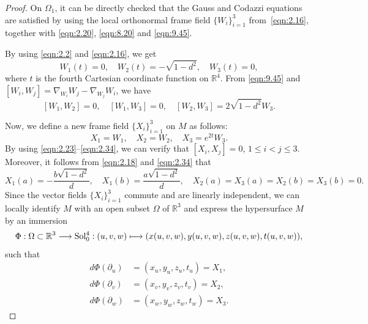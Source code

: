 \documentclass[reqno]{amsart}%
\theoremstyle{definition}
\numberwithin{equation}{section}
\begin{document}
	\begin{proof}
		On $\Omega_{1}$, it can be directly checked that the Gauss and Codazzi equations are satisfied by using the
		local orthonormal frame field $\{W_i\}_{i=1}^3$ from~\eqref{eqn:2.16}, together with \eqref{eqn:2.20}, \eqref{eqn:8.20}
		and \eqref{eqn:9.45}. 
		
		By using \eqref{eqn:2.2} and \eqref{eqn:2.16}, we get
		\begin{equation}\label{eqn:2.23}
			W_1(t)=0, \quad W_2(t)=-\sqrt{1-d^2}, \quad W_3(t)=0,
		\end{equation}
		where $t$ is the fourth Cartesian coordinate function on $\mathbb{R}^4$.
		From \eqref{eqn:9.45} and $[W_i,W_j]=\nabla_{W_i}W_j-\nabla_{W_j}W_i$, we have
		\begin{equation}\label{eqn:2.223}
			[W_1,W_2]=0, \quad [W_1,W_3]=0, \quad [W_2,W_3]=2\sqrt{1-d^2}W_3.
		\end{equation}
		
		Now, we define a new frame field $\{X_i\}_{i=1}^3$ on $M$ as follows:
		\begin{equation}\label{eqn:2.34}
			X_1=W_1, \quad X_2=W_2, \quad X_3=e^{2t}W_3.
		\end{equation}
		By using \eqref{eqn:2.23}--\eqref{eqn:2.34},
		we can verify that $[X_i,X_j]=0$, $1\leq i<j\leq3$.
		Moreover, it follows from \eqref{eqn:2.18} and \eqref{eqn:2.34} that
		\begin{equation}
			\label{eqn:2.31}    
			X_1(a)=-\frac{b\sqrt{1-d^2}}{d}, \quad
			X_1(b)=\frac{a\sqrt{1-d^2}}{d}, \quad
			X_2(a)=X_3(a)=X_2(b)=X_3(b)=0.
		\end{equation}
		Since the vector fields $\{X_i\}_{i=1}^3$ commute and are linearly independent, we can locally identify $M$ with an open subset $\Omega$ of $\mathbb{R}^3$
		and express the hypersurface $M$ by an immersion
		\begin{equation*}
			\begin{aligned}
				\Phi:\Omega\subset\mathbb{R}^3 \longrightarrow {\rm Sol_0^4}:
				(u,v,w) \longmapsto (x(u,v,w),y(u,v,w),z(u,v,w),t(u,v,w)),
			\end{aligned}
		\end{equation*}
		such that
		\begin{equation}\label{eqn:2.36}
			\begin{aligned}
				d\Phi(\partial_u)
				&=(x_u,y_u,
				z_u,t_u)=X_1,\\
				d\Phi(\partial_v)
				&=(x_v,y_v,
				z_v,t_v)=X_2,\\
				d\Phi(\partial_w)
				&=(x_w,y_w,
				z_w,t_w)=X_3.
			\end{aligned}
		\end{equation}
		

\end{proof}
\end{document}
